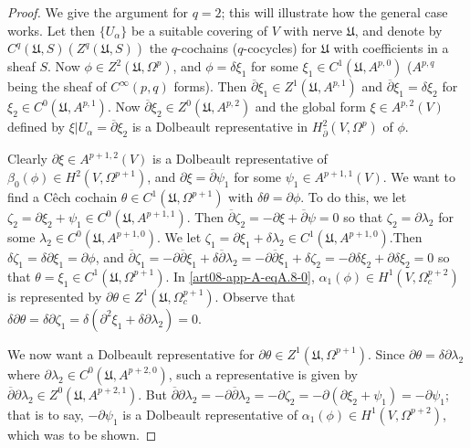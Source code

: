 \begin{proof}
We give the argument for $q=2$; this will illustrate how the general case works. Let then $\{U_{\alpha}\}$ be a suitable covering of $V$ with nerve $\mathfrak{U}$, and denote by $C^{q}(\mathfrak{U},S)(Z^{q}(\mathfrak{U},S))$ the $q$-cochains ($q$-cocycles) for $\mathfrak{U}$ with coefficients in a sheaf $S$. Now $\phi\in Z^{2}(\mathfrak{U},\Omega^{p})$, and $\phi=\delta\xi_{1}$ for some $\xi_{1}\in C^{1}(\mathfrak{U},A^{p,0})$ ($A^{p,q}$ being the sheaf of $C^{\infty}(p,q)$ forms). Then $\overline{\partial}\xi_{1}\in Z^{1}(\mathfrak{U},A^{p,1})$ and $\overline{\partial}\xi_{1}=\delta \xi_{2}$ for $\xi_{2}\in C^{0}(\mathfrak{U},A^{p,1})$. Now $\overline{\partial}\xi_{2}\in Z^{0}(\mathfrak{U},A^{p,2})$ and the global form $\xi\in A^{p,2}(V)$ defined by $\xi|U_{\alpha}=\overline{\partial}\xi_{2}$ is a Dolbeault representative in $H^{2}_{\overline{\partial}}(V,\Omega^{p})$ of $\phi$.

Clearly $\partial\xi\in A^{p+1,2}(V)$ is a Dolbeault representative of $\beta_{0}(\phi)\in H^{2}(V,\Omega^{p+1})$, and $\partial \xi=\overline{\partial}\psi_{1}$ for some $\psi_{1}\in A^{p+1,1}(V)$. We want to find a C\^ech cochain $\theta\in C^{1}(\mathfrak{U},\Omega^{p+1})$ with $\delta\theta=\partial\phi$. To do this, we let $\zeta_{2}=\partial\xi_{2}+\psi_{1}\in C^{0}(\mathfrak{U},A^{p+1,1})$. Then $\overline{\partial}\zeta_{2}=-\partial \xi +\overline{\partial}\psi=0$ so that $\zeta_{2}=\partial \lambda_{2}$ for some $\lambda_{2}\in C^{0}(\mathfrak{U},A^{p+1,0})$. We let $\zeta_{1}=\partial \xi_{1}+\delta\lambda_{2}\in C^{1}(\mathfrak{U}, A^{p+1,0})$.\pageoriginale Then $\delta \zeta_{1}=\delta \partial \xi_{1}=\partial \phi$, and $\overline{\partial}\zeta_{1}=-\partial\overline{\partial}\xi_{1}+\delta\overline{\partial}\lambda_{2}=-\partial\overline{\partial}\xi_{1}+\delta\zeta_{2}=-\partial\delta\xi_{2}+\partial \delta\xi_{2}=0$ so that $\theta=\xi_{1}\in C^{1}(\mathfrak{U},\Omega^{p+1})$. In \ref{art08-app-A-eqA.8-0}, $\alpha_{1}(\phi)\in H^{1}(V,\Omega^{p+2}_{c})$ is represented by $\partial \theta\in Z^{1}(\mathfrak{U},\Omega^{p+1}_{c})$. Observe that $\delta\partial \theta=\delta\partial \zeta_{1}=\delta(\partial^{2}\xi_{1}+\delta\partial \lambda_{2})=0$.

We now want a Dolbeault representative for $\partial \theta\in Z^{1}(\mathfrak{U},\Omega^{p+1})$. Since $\partial\theta=\delta\partial \lambda_{2}$ where $\partial\lambda_{2}\in C^{0}(\mathfrak{U},A^{p+2,0})$, such a representative is given by $\overline{\partial}\partial \lambda_{2}\in Z^{0}(\mathfrak{U},A^{p+2,1})$. But $\overline{\partial}\partial\lambda_{2}=-\partial\overline{\partial}\lambda_{2}=-\partial\zeta_{2}=-\partial (\partial \xi_{2}+\psi_{1})=-\partial\psi_{1}$; that is to say, $-\partial\psi_{1}$ is a Dolbeault representative of $\alpha_{1}(\phi)\in H^{1}(V,\Omega^{p+2})$, which was to be shown.


\end{proof}

